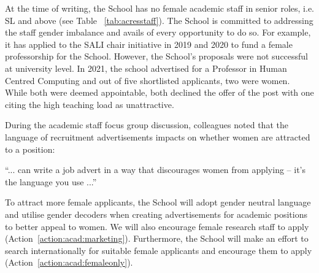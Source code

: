 

At the time of writing, the School has no female academic staff in senior roles, i.e. \ac{SL} and above (see Table~ \ref{tab:acresstaff}). 
%
The School is committed to addressing the staff gender imbalance and avails of every opportunity to do so. For example, it has applied to the \ac{SALI} chair initiative in 2019 and 2020 to fund a female professorship for the School. However, the School's proposals were not successful at university level. In 2021, the school advertised for a Professor in Human Centred Computing and out of five shortlisted applicants, two were women. While both were deemed appointable, both declined the offer of the post with one citing the high teaching load as unattractive.

During the academic staff focus group discussion, colleagues noted that the language of recruitment advertisements impacts on whether women are attracted to a position:

\begin{myquote}
``... can write a job advert in a way that discourages women from applying – it's the language you use ...''
\end{myquote}

To attract more female applicants, the School will adopt gender neutral language and utilise gender decoders when creating advertisements for academic positions to better appeal to women. We will also encourage female research staff to apply (Action~\ref{action:acad:marketing}). Furthermore, the School will make an effort to search internationally for suitable female applicants and encourage them to apply (Action~\ref{action:acad:femaleonly}).



